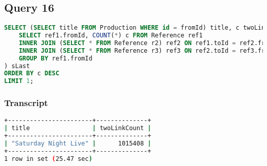 \subsection{Query 16}
\begin{lstlisting}[language=sql]
SELECT (SELECT title FROM Production WHERE id = fromId) title, c twoLinkCount FROM (
	SELECT ref1.fromId, COUNT(*) c FROM Reference ref1
	INNER JOIN (SELECT * FROM Reference r2) ref2 ON ref1.toId = ref2.fromId
	INNER JOIN (SELECT * FROM Reference r3) ref3 ON ref2.toId = ref3.fromId
	GROUP BY ref1.fromId
) sLast
ORDER BY c DESC
LIMIT 1;
\end{lstlisting}

\subsubsection{Transcript}
\begin{lstlisting}[language=bash]
+-----------------------+--------------+
| title                 | twoLinkCount |
+-----------------------+--------------+
| "Saturday Night Live" |      1015408 |
+-----------------------+--------------+
1 row in set (25.47 sec)
\end{lstlisting}

